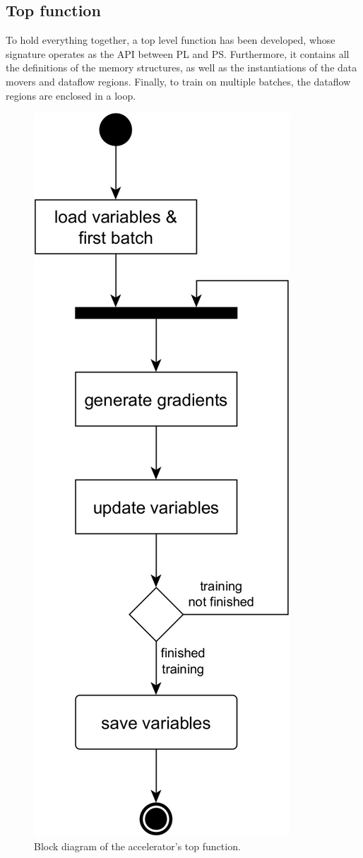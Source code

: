 \subsection{Top function}
To hold everything together, a top level function has been developed, whose signature operates as the API between PL and PS. Furthermore, it contains all the definitions of the memory structures, as well as the instantiations of the data movers and dataflow regions. Finally, to train on multiple batches, the dataflow regions are enclosed in a loop.

\begin{figure}[H] %
    \centering
        \includegraphics[height=0.5\textheight]{Images/block_diagrams/accel_top.png}
        \decoRule
        \caption[Top function]{Block diagram of the accelerator's top function.}
        \label{fig: top function}
\end{figure}

